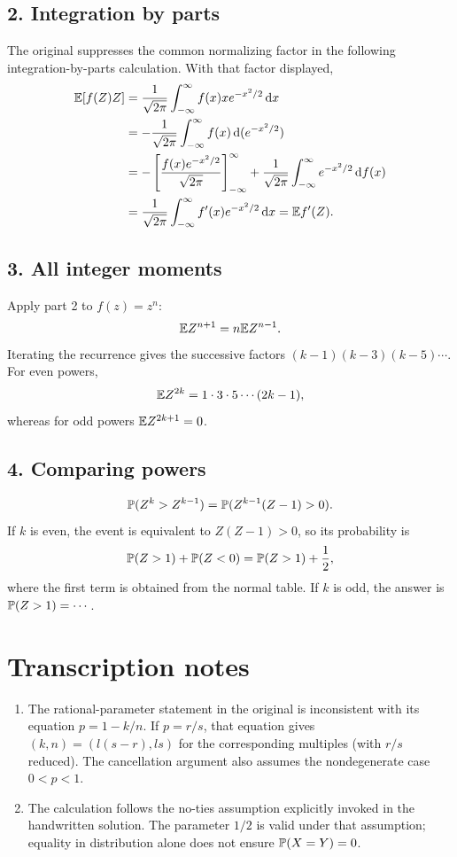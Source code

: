 \documentclass[11pt,a4paper]{article}
\begin{document}
\subsection*{2. Integration by parts}
The original suppresses the common normalizing factor in the following integration-by-parts calculation. With that factor displayed,
\begin{align*}
\E[f(Z)Z]
&=\frac1{\sqrt{2\pi}}\int_{-\infty}^\infty f(x)x e^{-x^2/2}\d x\\
&=-\frac1{\sqrt{2\pi}}\int_{-\infty}^\infty f(x)\d(e^{-x^2/2})\\
&=-\left[\frac{f(x)e^{-x^2/2}}{\sqrt{2\pi}}\right]_{-\infty}^{\infty}
+\frac1{\sqrt{2\pi}}\int_{-\infty}^\infty e^{-x^2/2}\d f(x)\\
&=\frac1{\sqrt{2\pi}}\int_{-\infty}^\infty f'(x)e^{-x^2/2}\d x
=\E f'(Z).
\end{align*}

\subsection*{3. All integer moments}
Apply part 2 to $f(z)=z^n$:
\[
\E Z^{n+1}=n\E Z^{n-1}.
\]
Iterating the recurrence gives the successive factors $(k-1)(k-3)(k-5)\cdots$. For even powers,
\[
\E Z^{2k}=1\cdot3\cdot5\cdots(2k-1),
\]
whereas for odd powers $\E Z^{2k+1}=0$.

\subsection*{4. Comparing powers}
\[
\P(Z^k>Z^{k-1})=\P(Z^{k-1}(Z-1)>0).
\]
If $k$ is even, the event is equivalent to $Z(Z-1)>0$, so its probability is
\[
\P(Z>1)+\P(Z<0)=\P(Z>1)+\frac12,
\]
where the first term is obtained from the normal table.
If $k$ is odd, the answer is $\P(Z>1)=\cdots$.

\section*{Transcription notes}
\begin{enumerate}
\item The rational-parameter statement in the original is inconsistent with its equation $p=1-k/n$. If $p=r/s$, that equation gives $(k,n)=(l(s-r),ls)$ for the corresponding multiples (with $r/s$ reduced). The cancellation argument also assumes the nondegenerate case $0<p<1$.
\item The calculation follows the no-ties assumption explicitly invoked in the handwritten solution. The parameter $1/2$ is valid under that assumption; equality in distribution alone does not ensure $\P(X=Y)=0$.
\end{enumerate}
\end{document}
